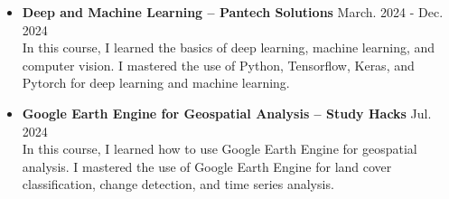 \documentclass[a4paper,10pt]{article}
\begin{document}
\begin{itemize}[leftmargin=*]
    \item \textbf{Deep and Machine Learning  – Pantech Solutions} \hfill March. 2024  {-} Dec. 2024\\
    In this course, I learned the basics of deep learning, machine learning, and computer vision. I mastered the use of Python, Tensorflow, Keras, and Pytorch for deep learning and machine learning.
    \item \textbf{Google Earth Engine for Geospatial Analysis – Study Hacks} \hfill Jul. 2024 \\
    In this course, I learned how to use Google Earth Engine for geospatial analysis. I mastered the use of Google Earth Engine for land cover classification, change detection, and time series analysis.
    
\end{itemize}
\end{document}
